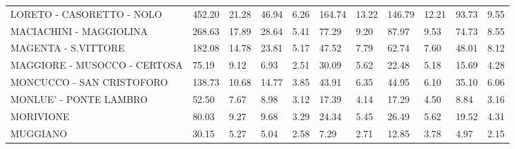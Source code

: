 \begin{table}[H]
{{\begin{tabular}{lp{1.3cm}p{1.3cm}p{1.3cm}p{1.3cm}p{1.3cm}p{1.3cm}p{1.3cm}p{1.3cm}p{1.3cm}p{1.3cm}}
LORETO - CASORETTO - NOLO                          &                    452.20 &                 21.28 &                       46.94 &                    6.26 &                      164.74 &                   13.22 &                      146.79 &                   12.21 &                     93.73 &                  9.55 \\
MACIACHINI - MAGGIOLINA                            &                    268.63 &                 17.89 &                       28.64 &                    5.41 &                       77.29 &                    9.20 &                       87.97 &                    9.53 &                     74.73 &                  8.55 \\
MAGENTA - S.VITTORE                                &                    182.08 &                 14.78 &                       23.81 &                    5.17 &                       47.52 &                    7.79 &                       62.74 &                    7.60 &                     48.01 &                  8.12 \\
MAGGIORE - MUSOCCO - CERTOSA                       &                     75.19 &                  9.12 &                        6.93 &                    2.51 &                       30.09 &                    5.62 &                       22.48 &                    5.18 &                     15.69 &                  4.28 \\
MONCUCCO - SAN CRISTOFORO                          &                    138.73 &                 10.68 &                       14.77 &                    3.85 &                       43.91 &                    6.35 &                       44.95 &                    6.10 &                     35.10 &                  6.06 \\
MONLUE' - PONTE LAMBRO                             &                     52.50 &                  7.67 &                        8.98 &                    3.12 &                       17.39 &                    4.14 &                       17.29 &                    4.50 &                      8.84 &                  3.16 \\
MORIVIONE                                          &                     80.03 &                  9.27 &                        9.68 &                    3.29 &                       24.34 &                    5.45 &                       26.49 &                    5.62 &                     19.52 &                  4.31 \\
MUGGIANO                                           &                     30.15 &                  5.27 &                        5.04 &                    2.58 &                        7.29 &                    2.71 &                       12.85 &                    3.78 &                      4.97 &                  2.15 \\

\end{tabular}}}
\end{table}
